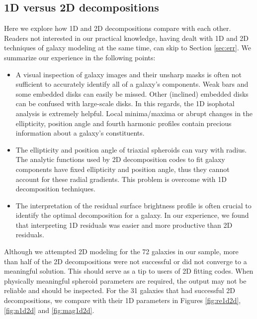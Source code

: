 \documentclass[preprint2]{emulateapj}
\begin{document}


\subsection{1D versus 2D decompositions}
Here we explore how 1D and 2D decompositions compare with each other. 
Readers not interested in our practical knowledge, 
having dealt with 1D and 2D techniques of galaxy modeling at the same time, can skip to Section \ref{sec:err}. 
We summarize our experience in the following points:
\begin{itemize}
\item A visual inspection of galaxy images and their unsharp masks is often not sufficient to accurately identify all of a galaxy's components. 
Weak bars and some embedded disks can easily be missed. 
Other (inclined) embedded disks can be confused with large-scale disks.
In this regards, the 1D isophotal analysis is extremely helpful. 
Local minima/maxima or abrupt changes in the ellipticity, position angle and fourth harmonic profiles contain precious information 
about a galaxy's constituents.
\item The ellipticity and position angle of triaxial spheroids can vary with radius.
The analytic functions used by 2D decomposition codes to fit galaxy components have fixed ellipticity and position angle, 
thus they cannot account for these radial gradients. 
This problem is overcome with 1D decomposition techniques.
\item The interpretation of the residual surface brightness profile is often crucial to identify the optimal decomposition for a galaxy. 
In our experience, we found that interpreting 1D residuals was easier and more productive than 2D residuals.
\end{itemize}
Although we attempted 2D modeling for the 72 galaxies in our sample, 
more than half of the 2D decompositions were not successful or did not converge to a meaningful solution. 
This should serve as a tip to users of 2D fitting codes. 
When physically meaningful spheroid parameters are required, 
the output may not be reliable and should be inspected.
For the 31 galaxies that had successful 2D decompositions, 
we compare with their 1D parameters in Figures \ref{fig:re1d2d}, \ref{fig:n1d2d} and \ref{fig:mag1d2d}.
\end{document}
